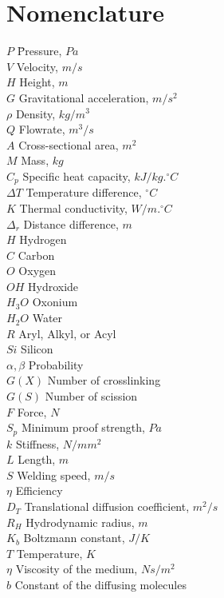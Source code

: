 \section*{Nomenclature}

\begin{tabbing}
$P$  {\hspace*{10mm}} \=  Pressure, $Pa$\\
$V$ \>  Velocity, $m/s$\\
$H$  \> Height, $m$\\
$G$ \> Gravitational acceleration, $m/s^2$ \\
$\rho$  \>  Density, $kg/m^3$\\
$Q$  \> Flowrate, $m^3/s$\\
$A$ \> Cross-sectional area, $m^2$\\
$M$ \> Mass, $kg$\\
$C_p$ \> Specific heat capacity, $kJ/kg.^\circ C$\\
$\Delta T$ \> Temperature difference, $^\circ C$\\
$K$  \> Thermal conductivity, $W/m. ^\circ C$\\
$\Delta_r$ \> Distance difference, $m$\\
$H$  \> Hydrogen\\
$C$ \> Carbon\\
$O$ \> Oxygen\\
$OH$ \> Hydroxide\\
$H_3 O$ \> Oxonium\\ 
$H_2 O$ \> Water\\
$R$ \> Aryl, Alkyl, or Acyl\\
$Si$  \> Silicon\\
$\alpha,\beta$ \> Probability\\
$G(X)$ \> Number of crosslinking\\
$G(S)$ \> Number of scission\\
$F$ \> Force, $N$\\
$S_p$ \> Minimum proof strength, $Pa$\\
$k$ \> Stiffness, $N/mm^2$\\
$L$ \> Length, $m$\\
$S$ \> Welding speed, $m/s$\\
$\eta$ \> Efficiency\\
$D_T$ \> Translational diffusion coefficient, $m^2/s$\\
$R_H$ \> Hydrodynamic radius, $m$\\
$K_b$ \> Boltzmann constant, $J/K$\\
$T$ \> Temperature, $K$\\
$\eta$ \> Viscosity of the medium, $Ns/m^2$\\
$b$ \> Constant of the diffusing molecules
\end{tabbing}
